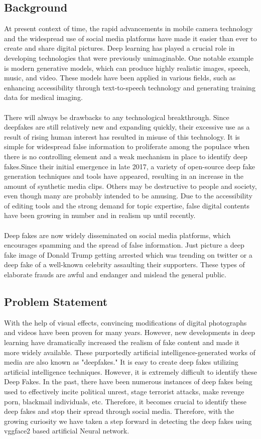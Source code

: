 \documentclass[12 pt]{article}
\begin{document}
\subsection{Background}
At present context of time, the rapid advancements in mobile camera technology and the widespread use of social media platforms have made it easier than ever to create and share digital pictures. Deep learning has played a crucial role in developing technologies that were previously unimaginable. One notable example is modern generative models, which can produce highly realistic images, speech, music, and video. These models have been applied in various fields, such as enhancing accessibility through text-to-speech technology and generating training data for medical imaging.
\\
\\
There will always be drawbacks to any technological breakthrough. Since deepfakes are still relatively new and expanding quickly, their excessive use as a result of rising human interest has resulted in misuse of this technology. It is simple for widespread false information to proliferate among the populace when there is no controlling element and a weak mechanism in place to identify deep fakes.Since their initial emergence in late 2017, a variety of open-source deep fake generation techniques and tools have appeared, resulting in an increase in the amount of synthetic media clips. Others may be destructive to people and society, even though many are probably intended to be amusing. Due to the accessibility of editing tools and the strong demand for topic expertise, false digital contents have been growing in number and in realism up until recently.
\\
\\
Deep fakes are now widely disseminated on social media platforms, which encourages spamming and the spread of false information. Just picture a deep fake image of Donald Trump getting arrested which was trending on twitter or a deep fake of a well-known celebrity assaulting their supporters.
These types of elaborate frauds are awful and endanger and mislead the general public.
\newpage
\subsection{Problem Statement}
With the help of visual effects, convincing modifications of digital photographs and videos have been proven for many years. However, new developments in deep learning have dramatically increased the realism of fake content and made it more widely available.   These purportedly artificial intelligence-generated works of media are also known as "deepfakes." It is easy to create deep fakes utilizing artificial intelligence techniques. However, it is extremely difficult to identify these Deep Fakes. In the past, there have been numerous instances of deep fakes being used to effectively incite political unrest, stage terrorist attacks, make revenge porn, blackmail individuals, etc. Therefore, it becomes crucial to identify these deep fakes and stop their spread through social media. Therefore, with the growing curiosity we have taken a
step forward in detecting the deep fakes using vggface2 based artificial Neural network.
\newpage
\end{document}
